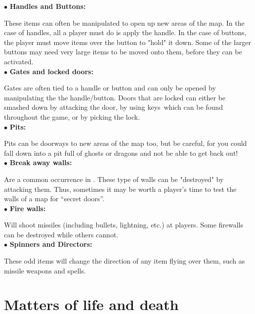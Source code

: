 $\bullet$ {\bf Handles and Buttons:}
 
These items can often be manipulated to open up new areas of the map.
In the case of handles, all a player must do is apply the handle. In
the case of buttons, the player must move items over the button to
"hold" it down. Some of the larger buttons may need very large items to
be moved onto them, before they can be activated. \\ 
 
$\bullet$ {\bf Gates and locked doors:} 
 
Gates are often tied to a handle or button and can only be opened by
manipulating the the handle/button. Doors that are locked can either be
smashed down by attacking the door, by using keys\ 
which can be found
throughout the game, or by picking the lock. \\ 
 
$\bullet$ {\bf Pits:} 
 
Pits can be doorways to new areas of the map too, but be careful, for
you could fall down into a pit full of ghosts or dragons and not be
able to get back out! \\ 
 
$\bullet$ {\bf Break away walls:} 
 
Are a common occurrence in \cf . These type of walls can be
"destroyed" by attacking them. Thus, sometimes it may be worth a
player's time to test the walls of a map for ``secret doors''. \\ 
 
$\bullet$ {\bf Fire walls:}  
 
Will shoot missiles (including bullets, lightning, etc.) at players. 
Some firewalls can be destroyed while others cannot. \\ 
 
$\bullet$ {\bf Spinners and Directors:} 
 
These odd items will change the direction of any item flying over them,
such as missile weapons and spells. \\ 


\section{Matters of life and death} 

